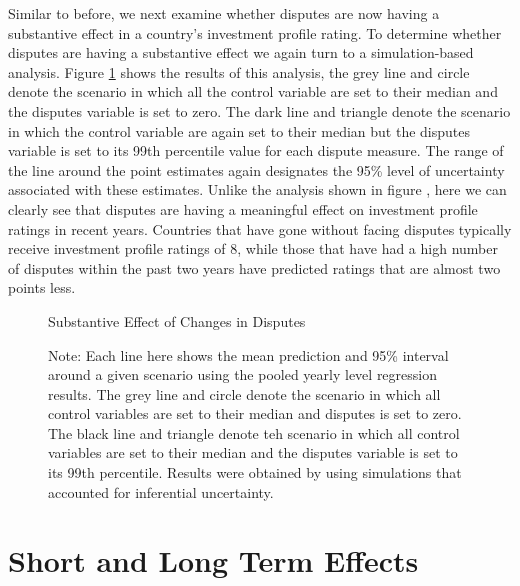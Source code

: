\documentclass[12pt,onesided]{amsart}
\begin{document}
Similar to before, we next examine whether disputes are now having a substantive effect in a country's investment profile rating. To determine whether disputes are having a substantive effect we again turn to a simulation-based analysis. Figure \ref{fig:dispEffectYearSim} shows the results of this analysis, the grey line and circle denote the scenario in which all the control variable are set to their median and the disputes variable is set to zero. The dark line and triangle denote the scenario in which the control variable are again set to their median but the disputes variable is set to its 99th percentile value for each dispute measure. The range of the line around the point estimates again designates the 95\% level of uncertainty associated with these estimates. Unlike the analysis shown in figure \label{fig:subEffect}, here we can clearly see that disputes are having a meaningful effect on investment profile ratings in recent years. Countries that have gone without facing disputes typically receive investment profile ratings of 8, while those that have had a high number of disputes within the past two years have predicted ratings that are almost two points less. 

\begin{figure}[ht]
	\vspace{4cm}
	\centering
	\caption{Substantive Effect of Changes in Disputes}
	\label{fig:dispEffectYearSim}
	\resizebox{1\textwidth}{!}{}
	\caption*{Note: Each line here shows the mean prediction and 95\% interval around a given scenario using the pooled yearly level regression results. The grey line and circle denote the scenario in which all control variables are set to their median and disputes is set to zero. The black line and triangle denote teh scenario in which all control variables are set to their median and the disputes variable is set to its 99th percentile. Results were obtained by using simulations that accounted for inferential uncertainty. }
\end{figure}

\section*{Short and Long Term Effects}
\end{document}

